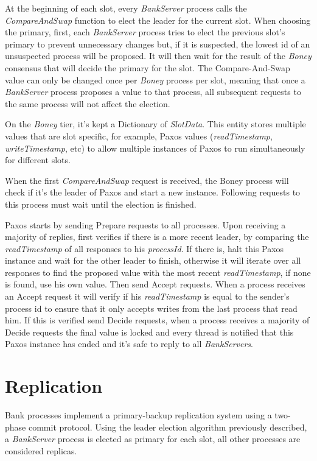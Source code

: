 \documentclass[times, 10pt,twocolumn]{article}
\begin{document}
At the beginning of each slot, every \textit{BankServer} process calls the \textit{CompareAndSwap} function to elect the leader for the current slot.
When choosing the primary, first, each \textit{BankServer} process tries to elect the previous slot’s primary to prevent unnecessary changes but, if it is suspected, the lowest id of an unsuspected process will be proposed. It will then wait for the result of the \textit{Boney} consensus that will decide the primary for the slot.
The Compare-And-Swap value can only be changed once per \textit{Boney} process per slot, meaning that once a \textit{BankServer} process proposes a value to that process, all subsequent requests to the same process will not affect the election.


On the \textit{Boney} tier, it’s kept a Dictionary of \textit{SlotData}. This entity stores multiple values that are slot specific, for example, Paxos values (\textit{readTimestamp}, \textit{writeTimestamp}, etc) to allow multiple instances of Paxos to run simultaneously for different slots.

When the first \textit{CompareAndSwap} request is received, the Boney process will check if it's the leader of Paxos and start a new instance. Following requests to this process must wait until the election is finished.

Paxos starts by sending Prepare requests to all processes. Upon receiving a majority of replies, first verifies if there is a more recent leader, by comparing the \textit{readTimestamp} of all responses to his \textit{processId}. If there is, halt this Paxos instance and wait for the other leader to finish, otherwise it will iterate over all responses to find the proposed value with the most recent \textit{readTimestamp}, if none is found, use his own value.
Then send Accept requests. When a process receives an Accept request it will verify if his \textit{readTimestamp} is equal to the sender’s process id to ensure that it only accepts writes from the last process that read him. If this is verified send Decide requests, when a process receives a  majority of Decide requests the final value is locked and every thread is notified that this Paxos instance has ended and it's safe to reply to all \textit{BankServers}.


\section{ Replication }
Bank processes implement a primary-backup replication system using a two-phase commit protocol.
Using the leader election algorithm previously described, a \textit{BankServer} process is elected as primary for each slot, all other processes are considered replicas.
\end{document}
